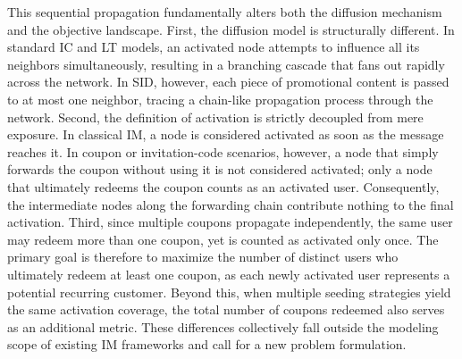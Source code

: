 \documentclass{article}
\begin{document}
This sequential propagation fundamentally alters both the diffusion mechanism and the objective landscape. First, the diffusion model is structurally different. In standard IC and LT models, an activated node attempts to influence all its neighbors simultaneously, resulting in a branching cascade that fans out rapidly across the network. In SID, however, each piece of promotional content is passed to at most one neighbor, tracing a chain-like propagation process through the network. Second, the definition of activation is strictly decoupled from mere exposure. In classical IM, a node is considered activated as soon as the message reaches it. In coupon or invitation-code scenarios, however, a node that simply forwards the coupon without using it is not considered activated; only a node that ultimately redeems the coupon counts as an activated user. Consequently, the intermediate nodes along the forwarding chain contribute nothing to the final activation. Third, since multiple coupons propagate independently, the same user may redeem more than one coupon, yet is counted as activated only once. The primary goal is therefore to maximize the number of distinct users who ultimately redeem at least one coupon, as each newly activated user represents a potential recurring customer. Beyond this, when multiple seeding strategies yield the same activation coverage, the total number of coupons redeemed also serves as an additional metric. These differences collectively fall outside the modeling scope of existing IM frameworks and call for a new problem formulation.
\end{document}
